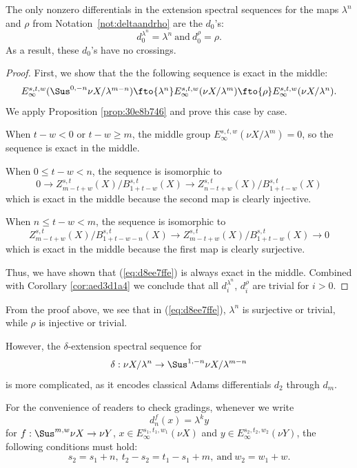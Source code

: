 \documentclass{amsart}
\numberwithin{equation}{section}
\begin{document}
\begin{proposition}\label{prop:9770ae6e} 
The only nonzero differentials in the extension spectral sequences for the maps $\lambda^n$ and $\rho$ from Notation~\ref{not:deltaandrho} are the $d_0$'s:
$$d^{\lambda^n}_0=\lambda^n \ \text{and} \ d^{\rho}_0=\rho.$$ 
As a result, these $d_0$'s have no crossings.
\end{proposition}
\begin{proof}
    First, we show that the the following sequence is exact in the middle:
    \begin{equation}\label{eq:d8ee7ffe}
        \scalebox{1}{$E_\infty^{s,t,w}(\Sus^{0,-n}\nu X/\lambda^{m-n})\fto{\lambda^n} E_\infty^{s,t,w}(\nu X/\lambda^{m})\fto{\rho} E_\infty^{s,t,w}(\nu X/\lambda^{n})$}.
    \end{equation}
    We apply Proposition \ref{prop:30e8b746} and prove this case by case.

    When $t-w<0$ or $t-w\ge m$, the middle group $E_\infty^{s,t,w}(\nu X/\lambda^{m}) = 0$, so the sequence is exact in the middle.
    
    When $0\le t-w<n$, the sequence is isomorphic to
    $$0\to Z^{s,t}_{m-t+w}(X)/B^{s,t}_{1+t-w}(X)\to Z^{s,t}_{n-t+w}(X)/B^{s,t}_{1+t-w}(X)$$
    which is exact in the middle because the second map is clearly injective.

    When $n\le t-w<m$, the sequence is isomorphic to
    $$Z^{s,t}_{m-t+w}(X)/B^{s,t}_{1+t-w-n}(X)\to Z^{s,t}_{m-t+w}(X)/B^{s,t}_{1+t-w}(X)\to 0$$
    which is exact in the middle because the first map is clearly surjective.

    Thus, we have shown that (\ref{eq:d8ee7ffe}) is always exact in the middle. Combined with Corollary \ref{cor:aed3d1a4} we conclude that all $d^{\lambda^n}_i$, $d^{\rho}_i$ are trivial for $i>0$.
\end{proof}

\begin{remark}
    From the proof above, we see that in (\ref{eq:d8ee7ffe}), $\lambda^n$ is surjective or trivial, while $\rho$ is injective or trivial.
\end{remark}

However, the $\delta$-extension spectral sequence for
$$\delta:\nu X/\lambda^n\to \Sus^{1,-n}\nu X/\lambda^{m-n}$$
is more complicated, as it encodes classical Adams differentials $d_2$ through $d_m$.

\begin{remark}
    For the convenience of readers to check gradings, whenever we write 
    $$d_{n}^{f}(x)=\lambda^k y$$
    for $f: \Sus^{m,w} \nu X\to \nu Y$,
    $x\in E_\infty^{s_1,t_1,w_1}(\nu X)$ and
    $y\in E_\infty^{s_2,t_2,w_2}(\nu Y)$,
    the following conditions must hold: 
    $$s_2=s_1+n, \ t_2-s_2=t_1-s_1+m, \ \text{and} \ w_2=w_1+w.$$
\end{remark}
\end{document}
